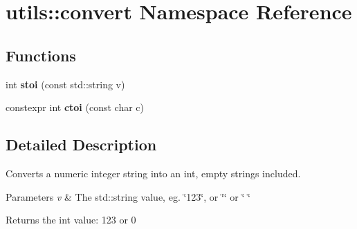 \hypertarget{namespaceutils_1_1convert}{}\section{utils\+:\+:convert Namespace Reference}
\label{namespaceutils_1_1convert}
\subsection*{Functions}
\begin{DoxyCompactItemize}
\item 
\mbox{\label{namespaceutils_1_1convert_aeeef7951a8e0720ee801fa4c98ecaa89}} 
int {\bfseries stoi} (const std\+::string v)
\item 
\mbox{\label{namespaceutils_1_1convert_aa51714dd61ffe84d524e028f7769b19a}} 
constexpr int {\bfseries ctoi} (const char c)
\end{DoxyCompactItemize}


\subsection{Detailed Description}
Converts a numeric integer string into an int, empty strings included.


\begin{DoxyParams}{Parameters}
{\em v} & The std\+::string value, eg. \char`\"{}123\char`\"{}, or \char`\"{}\char`\"{} or \char`\"{} \char`\"{} \\
\hline
\end{DoxyParams}
\begin{DoxyReturn}{Returns}
the int value\+: 123 or 0 
\end{DoxyReturn}
